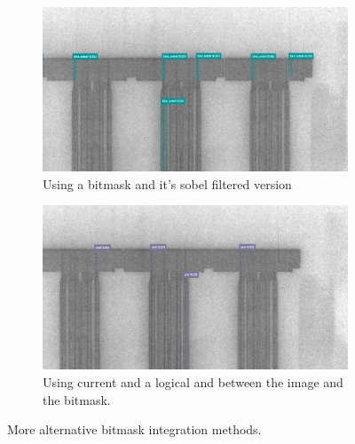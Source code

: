 \begin{figure}[!h]
\centering

  \begin{subfigure}{.9\textwidth}
    \centering
    \includegraphics[width=\linewidth]{images/implementation/results/bm/bm_sobel}
    \caption{Using a bitmask and it's sobel filtered version}
  \end{subfigure}

  \begin{subfigure}{.9\textwidth}
    \centering
    \includegraphics[width=\linewidth]{images/implementation/results/bm/and}
    \caption{Using current and a logical and between the image and the bitmask.}
  \end{subfigure}

  \caption{More alternative bitmask integration methods.}
  \label{app:bm_compare_ext_2}
\end{figure}
